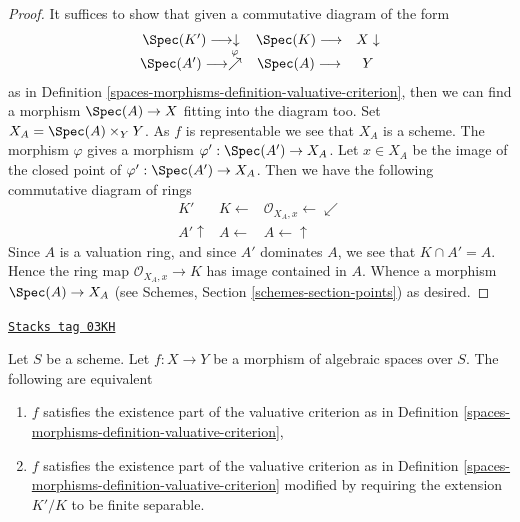\begin{proof}
It suffices to show that given a commutative diagram of the form
$$
\begin{array}{ccc}\Spec(K') \longrightarrow\downarrow & \Spec(K) \longrightarrow & X \downarrow \\ \Spec(A') \longrightarrow\overset{\varphi}{\nearrow} & \Spec(A) \longrightarrow & Y\end{array}
$$
as in Definition \ref{spaces-morphisms-definition-valuative-criterion}, then we can
find a morphism $\Spec(A) \to X$ fitting into the diagram too.
Set $X_A = \Spec(A) \times_Y Y$. As $f$ is representable we see
that $X_A$ is a scheme. The morphism $\varphi$ gives a morphism
$\varphi' : \Spec(A') \to X_A$. Let $x \in X_A$ be the image of
the closed point of $\varphi' : \Spec(A') \to X_A$. Then we
have the following commutative diagram of rings
$$
\begin{array}{ccc}K' & K \longleftarrow & \mathcal{O}_{X_A, x} \longleftarrow\swarrow \\ A' \uparrow & A \longleftarrow & A \longleftarrow\uparrow\end{array}
$$
Since $A$ is a valuation ring, and since $A'$ dominates $A$, we see
that $K \cap A' = A$. Hence the ring map $\mathcal{O}_{X_A, x} \to K$
has image contained in $A$. Whence a morphism $\Spec(A) \to X_A$ (see
Schemes, Section \ref{schemes-section-points})
as desired.
\end{proof}

\begin{lemma}
\label{spaces-morphisms-lemma-finite-separable-enough}
\href{https://stacks.math.columbia.edu/tag/03KH}{\texttt{Stacks tag 03KH}}

Let $S$ be a scheme.
Let $f : X \to Y$ be a morphism of algebraic spaces over $S$.
The following are equivalent
\begin{enumerate}
\item $f$ satisfies the existence part of the valuative criterion
as in Definition \ref{spaces-morphisms-definition-valuative-criterion},
\item $f$ satisfies the existence part of the valuative criterion
as in Definition \ref{spaces-morphisms-definition-valuative-criterion} modified by
requiring the extension $K'/K$ to be finite separable.
\end{enumerate}
\end{lemma}

